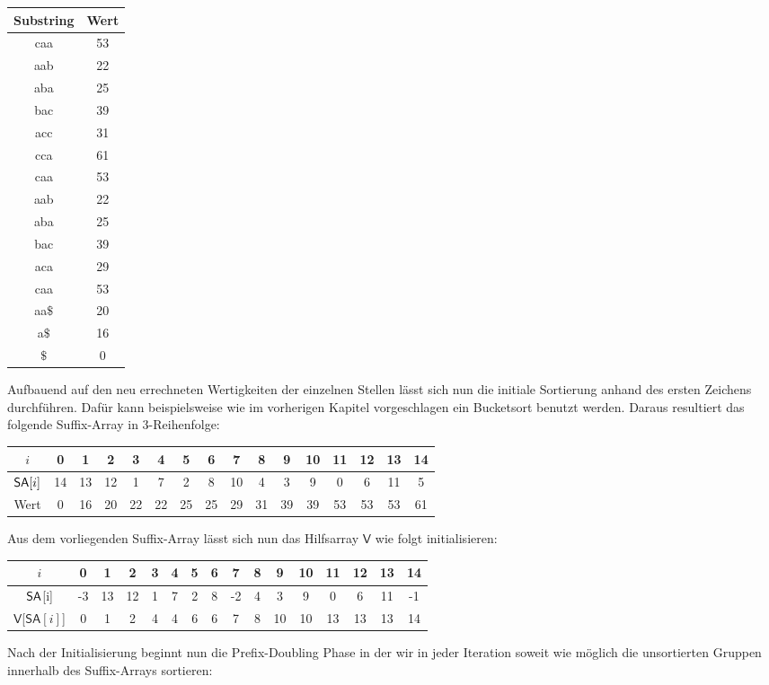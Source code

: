 \begin{center}
\begin{tabular}{c | c}
Substring & Wert \\
\hline
caa & 53 \\
aab & 22 \\
aba & 25 \\
bac & 39 \\
acc & 31 \\
cca & 61 \\
caa & 53 \\
aab & 22 \\
aba & 25 \\
bac & 39 \\
aca & 29 \\
caa & 53 \\
aa$\$$ & 20 \\
a$\$$ & 16 \\
$\$$ & 0 
\end{tabular}
\end{center}

Aufbauend auf den neu errechneten Wertigkeiten der einzelnen Stellen lässt sich nun die initiale Sortierung anhand des ersten Zeichens durchführen. Dafür kann beispielsweise wie im vorherigen Kapitel vorgeschlagen ein Bucketsort benutzt werden. Daraus resultiert das folgende Suffix-Array in 3-Reihenfolge:\\
\begin{center}
\begin{tabular}{| c | c | c | c | c | c | c | c | c | c | c | c | c | c | c | c |}
\hline
$i$ & 0 & 1 &2 &3 &4 &5 &6 &7 &8 &9 &10 &11 &12 &13 &14 \\
\hline
$\sa[i]$ & 14 & 13 &12 &1 &7 & 2 &8 &10 &4 &3 &9 &0 &6 &11 &5 \\
\hline
Wert & 0 & 16 &20 &22 &22 &25 &25 &29 &31 &39 &39 &53 &53 &53 &61 \\
\hline
\end{tabular}
\end{center}
Aus dem vorliegenden Suffix-Array lässt sich nun das Hilfsarray $\mathsf{V}$ wie folgt initialisieren:\\
\begin{center}
\begin{tabular}{| c | c | c | c | c | c | c | c | c | c | c | c | c | c | c | c |}
\hline
$i$ & 0 & 1 &2 &3 &4 &5 &6 &7 &8 &9 &10 &11 &12 &13 &14 \\
\hline
$\sa$[i] & -3 & 13 &12 &1 &7 & 2 &8 &-2 &4 &3 &9 &0 &6 &11 &-1 \\

$\mathsf{V}$[$\mathsf{SA}[i]$] & 0 & 1 & 2 & 4 & 4 & 6 & 6 & 7 & 8 & 10 & 10 & 13 & 13 & 13 & 14 \\
\hline
\end{tabular}
\end{center}
Nach der Initialisierung beginnt nun die Prefix-Doubling Phase in der wir in jeder Iteration soweit wie möglich die unsortierten Gruppen innerhalb des Suffix-Arrays sortieren:

